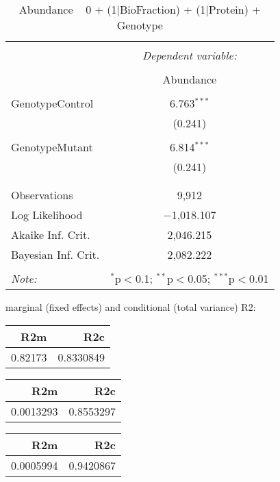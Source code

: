\documentclass[11pt]{report}
\begin{document}
\begin{table}[!htbp] \centering 
  \caption{Abundance ~ 0 + (1|BioFraction) + (1|Protein) + Genotype} 
  \label{} 
\begin{tabular}{@{\extracolsep{5pt}}lc} 
\\[-1.8ex]\hline 
\hline \\[-1.8ex] 
 & \multicolumn{1}{c}{\textit{Dependent variable:}} \\ 
\cline{2-2} 
\\[-1.8ex] & Abundance \\ 
\hline \\[-1.8ex] 
 GenotypeControl & 6.763$^{***}$ \\ 
  & (0.241) \\ 
  & \\ 
 GenotypeMutant & 6.814$^{***}$ \\ 
  & (0.241) \\ 
  & \\ 
\hline \\[-1.8ex] 
Observations & 9,912 \\ 
Log Likelihood & $-$1,018.107 \\ 
Akaike Inf. Crit. & 2,046.215 \\ 
Bayesian Inf. Crit. & 2,082.222 \\ 
\hline 
\hline \\[-1.8ex] 
\textit{Note:}  & \multicolumn{1}{r}{$^{*}$p$<$0.1; $^{**}$p$<$0.05; $^{***}$p$<$0.01} \\ 
\end{tabular} 
\end{table} 
marginal (fixed effects) and conditional (total variance) R2:

\begin{tabular}{r|r}
\hline
R2m & R2c\\
\hline
0.82173 & 0.8330849\\
\hline
\end{tabular}

\begin{tabular}{r|r}
\hline
R2m & R2c\\
\hline
0.0013293 & 0.8553297\\
\hline
\end{tabular}

\begin{tabular}{r|r}
\hline
R2m & R2c\\
\hline
0.0005994 & 0.9420867\\
\hline
\end{tabular}
\end{document}
